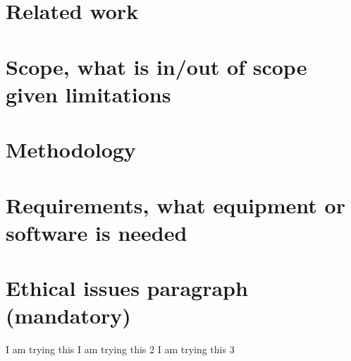 \documentclass[11pt]{report}
\begin{document}
\paragraph{}


\section*{Related work}
\section*{Scope, what is in/out of scope given limitations}
\section*{Methodology}
\section*{Requirements, what equipment or software is needed}
\section*{Ethical issues paragraph (mandatory)}




\begin{thebibliography}{1}
  I am trying this 
  I am trying this 2 
  I am trying this 3
\end{thebibliography}
\end{document}
